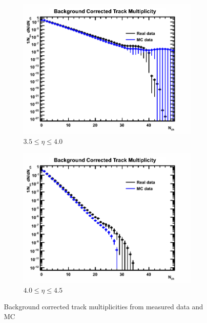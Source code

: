 \begin{figure}[H]
\begin{subfigure}{0.32\textwidth}
		\includegraphics[width=\textwidth]{Chapters/multiplicity/charged_particle_event_multiplicity/images/background_correction_comparison/3_5-4_0.png}
		\caption{$3.5 \le \eta \le 4.0$}
	\end{subfigure}
	\begin{subfigure}{0.32\textwidth}
		\includegraphics[width=\textwidth]{Chapters/multiplicity/charged_particle_event_multiplicity/images/background_correction_comparison/4_0-4_5.png}
		\caption{$4.0 \le \eta \le 4.5$}
	\end{subfigure}
	\caption{Background corrected track multiplicities from measured data and MC}
	\label{fig: background corrected track multiplicity comparison}
\end{figure}

